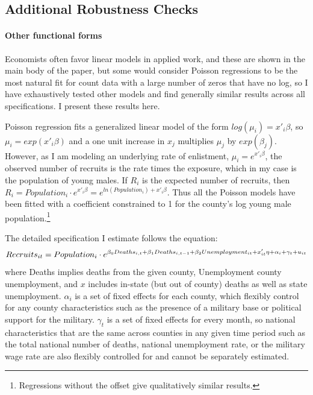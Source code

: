 \documentclass[12pt] {article}
\begin{document}
\subsection {Additional Robustness Checks}
\paragraph{Other functional forms}
Economists often favor linear models in applied work, and these are shown in the main body of the paper, but some would consider Poisson regressions to be the most natural fit for count data with a large number of zeros that have no log, so I have exhaustively tested other models and find generally similar results across all specifications. I present these results here. 

Poisson regression fits a generalized linear model of the form $log(\mu_{i})=x'_{i}\beta$, so $\mu_{i}=exp(x'_{i}\beta)$ and a one unit increase in $x_{j}$ multiplies $\mu_{j}$ by $exp(\beta_{j})$. However, as I am modeling an underlying rate of enlistment, $\mu_{i}=e^{x'_{i}\beta}$, the observed number of recruits is the rate times the exposure, which in my case is the population of young males. If $R_{i}$ is the expected number of recruits, then $R_{i}=Population_{i}\cdot e^{x'_{i}\beta}=e^{ln(Population_{i})+x'_{i}\beta}$.
Thus all the Poisson models have been fitted with a coefficient constrained
to 1 for the county's log young male population.\footnote{Regressions without the offset give qualitatively similar results.} 

The detailed specification I estimate follows the equation: 
$$Recruits_{it}=Population_{i}\cdot e^{\beta_{0}Deaths_{i,t}+\beta_{1}Deaths_{i,t-1}+\beta_{2}Unemployment_{it}\\
+x'_{it}\eta+\alpha_{i}+\gamma_{t}+u_{it}}$$
where Deaths implies deaths from the given county, Unemployment county unemployment, and $x$ includes in-state (but out of county) deaths as well as
state unemployment. $\alpha_{i}$ is a set of fixed effects for each county, which flexibly control for any county characteristics such as the presence of a military base or political support for the military. $\gamma_{t}$ is a set of fixed effects for every month, so national characteristics that are the same across counties in any
given time period such as the total national number of deaths, national
unemployment rate, or the military wage rate are also flexibly controlled for and cannot be separately estimated. 

\end{document}

